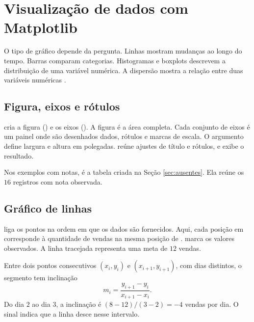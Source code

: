 \section{Visualização de dados com Matplotlib}
\label{sec:visualizacao}

O tipo de gráfico depende da pergunta. Linhas mostram mudanças ao longo do tempo. Barras comparam categorias. Histogramas e boxplots descrevem a distribuição de uma variável numérica. A dispersão mostra a relação entre duas variáveis numéricas \cite{matplotlib}.

\subsection{Figura, eixos e rótulos}

 cria a figura () e os eixos (). A figura é a área completa. Cada conjunto de eixos é um painel onde são desenhados dados, rótulos e marcas de escala. O argumento  define largura e altura em polegadas.  reúne ajustes de título e rótulos, e  exibe o resultado.

Nos exemplos com notas,  é a tabela criada na Seção \ref{sec:ausentes}. Ela reúne os \(16\) registros com nota observada.

\subsection{Gráfico de linhas}

 liga os pontos na ordem em que os dados são fornecidos. Aqui, cada posição em  corresponde à quantidade de vendas na mesma posição de .  marca os valores observados. A linha tracejada representa uma meta de \(12\) vendas.

Entre dois pontos consecutivos \((x_i,y_i)\) e \((x_{i+1},y_{i+1})\), com dias distintos, o segmento tem inclinação
\[
  m_i=\frac{y_{i+1}-y_i}{x_{i+1}-x_i}.
\]
Do dia \(2\) ao dia \(3\), a inclinação é \((8-12)/(3-2)=-4\) vendas por dia. O sinal indica que a linha desce nesse intervalo.


